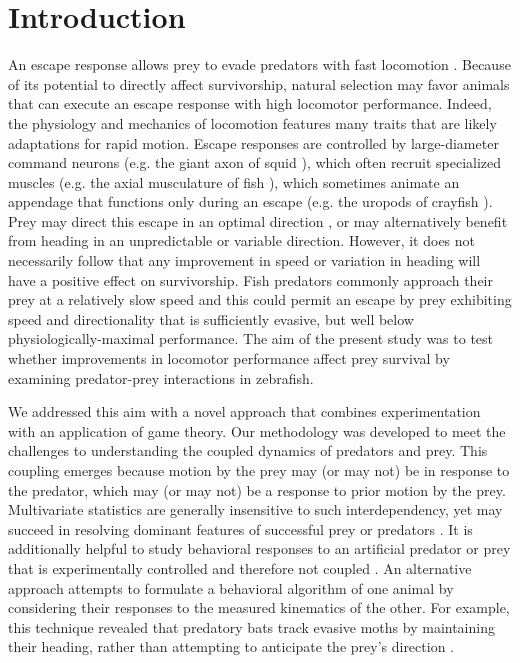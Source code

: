 \documentclass[]{rsos}%
\begin{document}
\section{Introduction}
An escape response allows prey to evade predators with fast locomotion \cite{Bullock:1984gd}.
Because of its potential to directly affect survivorship, natural selection may favor animals that can execute an escape response with high locomotor performance.
Indeed, the physiology and mechanics of locomotion features many traits that are likely adaptations for rapid motion.
Escape responses are controlled by large-diameter command neurons (e.g. the giant axon of squid \cite{YOUNG:1938vi}), which often recruit specialized muscles (e.g. the axial musculature of fish \cite{Eaton:1975ux}), which sometimes animate an appendage that functions only during an escape (e.g. the uropods of crayfish \cite{Johnson:1926cl}).
Prey may direct this escape in an optimal direction \cite{Weihs:1984tb}, or may alternatively benefit from heading in an unpredictable \cite{Humphries:1970hy} or variable \cite{Howland:1974ud} direction.
However, it does not necessarily follow that any improvement in speed or variation in heading will have a positive effect on survivorship.
Fish predators commonly approach their prey at a relatively slow speed \cite{Webb:1984jz,Higham:2007go} and this could permit an escape by prey exhibiting speed and directionality that is sufficiently evasive, but well below physiologically-maximal performance. 
The aim of the present study was to test whether improvements in locomotor performance affect prey survival by examining predator-prey interactions in zebrafish.

We addressed this aim with a novel approach that combines experimentation with an application of game theory.
Our methodology was developed to meet the challenges to understanding the coupled dynamics of predators and prey.
This coupling emerges because motion by the prey may (or may not) be in response to the predator, which may (or may not) be a response to prior motion by the prey. 
Multivariate statistics are generally insensitive to such interdependency, yet may succeed in resolving dominant features of successful prey \cite{Walker:2005vn} or predators \cite{Wainwright:2001ufa}.
It is additionally helpful to study behavioral responses to an artificial predator or prey that is experimentally controlled and therefore not coupled \cite{Gabbiani:1999wz,Stewart:2014cma,Heuch:2007kk,Wainwright:2001ufa,Shifferman:2004fs}.
An alternative approach attempts to formulate a behavioral algorithm of one animal by considering their responses to the measured kinematics of the other.
For example, this technique revealed that predatory bats track evasive moths by maintaining their heading, rather than attempting to anticipate the prey's direction \cite{Ghose:2006dk}. 
\end{document}
